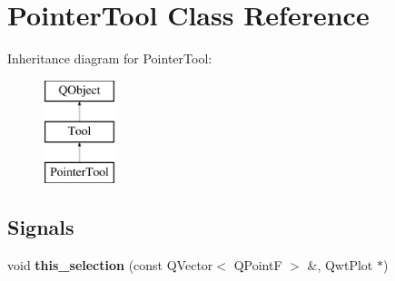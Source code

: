 \hypertarget{classPointerTool}{}\section{Pointer\+Tool Class Reference}
\label{classPointerTool}
Inheritance diagram for Pointer\+Tool\+:\begin{figure}[H]
\begin{center}
\leavevmode
\includegraphics[height=3.000000cm]{classPointerTool}
\end{center}
\end{figure}
\subsection*{Signals}
\begin{DoxyCompactItemize}
\item 
\mbox{\label{classTool_a68dea3e4c911f3174176084d350865cc}} 
void {\bfseries this\+\_\+selection} (const Q\+Vector$<$ Q\+PointF $>$ \&, Qwt\+Plot $\ast$)
\end{DoxyCompactItemize}
